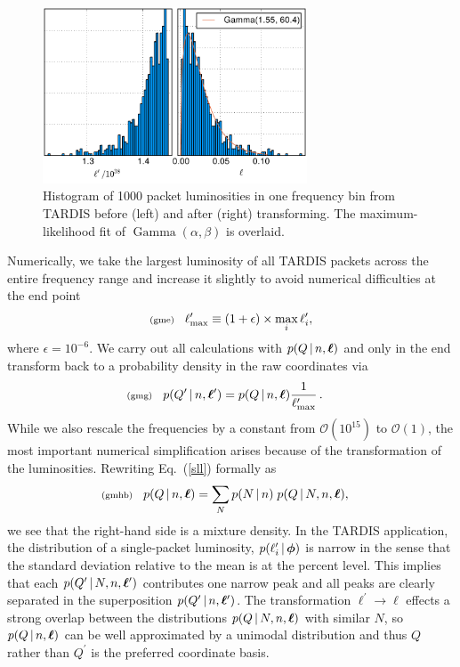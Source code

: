 \documentclass[11pt]{article}
\newcommand{\lleq}[1]{\label{#1} }
\renewcommand{\lleq}[1]{\label{#1} {\scriptstyle {\rm (#1)}} \hspace*{2ex} }
\newcommand{\cond}{\,|\,}
\newcommand{\refeq}[1]{Eq.~(\ref{#1})}
\DeclareMathOperator{\GammaDist}{Gamma}
\newcommand{\lmax}{\ell_{\rm max}}
\newcommand{\Lumtot}{Q}
\newcommand{\tardis}{TARDIS}
\begin{document}
\begin{figure}[ht]
  \centering
  \includegraphics[width=0.7\textwidth]{tardis_input_trafo}
  \caption{Histogram of 1000 packet luminosities in one frequency bin
    from \tardis{} before (left) and after (right) transforming. The
    maximum-likelihood fit of $\GammaDist(\alpha, \beta)$ is overlaid.}
\label{fig:tardis}
\end{figure}

Numerically, we take the largest luminosity of all \tardis{} packets
across the entire frequency range and increase it slightly to avoid
numerical difficulties at the end point
\begin{align}
  \lleq{gme}
  \lmax^\prime \equiv (1+\epsilon) \times \max_i \ell_i^\prime,
\end{align}
where $ \epsilon=10^{-6}$. We carry out all calculations with
$p(\Lumtot \cond n,\bml)$ and only in the end transform back to a
probability density in the raw coordinates via
\begin{align}
  \lleq{gmg}
  p(\Lumtot^\prime  \cond n, \bml^\prime)
  &= p(\Lumtot  \cond n, \bml) \frac{1}{\lmax^\prime} \,.
\end{align}
While we also rescale the frequencies by a constant from
$\mathcal{O}(10^{15})$ to $\mathcal{O}(1)$, the most important
numerical simplification arises because of the transformation of the
luminosities. Rewriting \refeq{sll} formally as
\begin{align}
  \lleq{gmhb}
  p(Q  \cond n,\bml)
  & = \sum_{N} p(N \cond n)\; p(Q \cond N, n, \bml),
\end{align}
we see that the right-hand side is a mixture density. In the \tardis{}
application, the distribution of a single-packet luminosity,
$p\qty(\ell_i' \cond \bmphi)$ is narrow in the sense that the standard
deviation relative to the mean is at the percent level. This implies
that each $p(Q^\prime \cond N, n, \bml^\prime)$ contributes one narrow
peak and all peaks are clearly separated in the superposition
$ p(Q^\prime \cond n,\bml^\prime)$. The transformation
$\ell^\prime \to \ell$ effects a strong overlap between the
distributions $p(\Lumtot \cond N, n, \bml)$ with similar $N$, so
$p(\Lumtot \cond n, \bml)$ can be well approximated by a unimodal
distribution and thus $\Lumtot$ rather than $\Lumtot^\prime$ is the
preferred coordinate basis.
\end{document}

